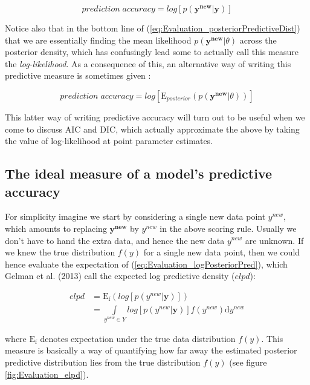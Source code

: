 \documentclass[11pt,fullpage]{book}
\begin{document}
\begin{equation}\label{eq:Evaluation_logPosteriorPred}
prediction\; accuracy = log\left[p(\boldsymbol{y^{new}}|\boldsymbol{y})\right]
\end{equation}

Notice also that in the bottom line of (\ref{eq:Evaluation_posteriorPredictiveDist}) that we are essentially finding the mean likelihood $p(\boldsymbol{y^{new}}|\theta)$ across the posterior density, which has confusingly lead some to actually call this measure the \textit{log-likelihood}. As a consequence of this, an alternative way of writing this predictive measure is sometimes given \cite{gelman2013bayesian}:

\begin{equation}\label{eq:Evaluation_logLikelihood}
prediction\; accuracy = log\left[\mathrm{E}_{posterior}(p(\boldsymbol{y^{new}}|\theta))\right]
\end{equation}

This latter way of writing predictive accuracy will turn out to be useful when we come to discuss AIC and DIC, which actually approximate the above by taking the value of log-likelihood at point parameter estimates.

\subsection{The ideal measure of a model's predictive accuracy}\label{sec:Evaluation_idealAccuracy}
For simplicity imagine we start by considering a single new data point $y^{new}$, which amounts to replacing $\boldsymbol{y^{new}}$ by $y^{new}$ in the above scoring rule. Usually we don't have to hand the extra data, and hence the new data $y^{new}$ are unknown. If we knew the true distribution $f(y)$ for a single new data point, then we could hence evaluate the expectation of (\ref{eq:Evaluation_logPosteriorPred}), which Gelman et al. (2013) call the expected log predictive density ($elpd$):

\begin{align}\label{eq:Evaluation_elpd}
elpd &= \mathrm{E_f}\left(log\left[p(y^{new}|\boldsymbol{y})\right]\right)\\
&= \int\limits_{y^{new}\in Y} log\left[p(y^{new}|\boldsymbol{y})\right] f(y^{new})\mathrm{d}y^{new}
\end{align}

where $\mathrm{E_f}$ denotes expectation under the true data distribution $f(y)$. This measure is basically a way of quantifying how far away the estimated posterior predictive distribution lies from the true distribution $f(y)$ (see figure \ref{fig:Evaluation_elpd}).
\end{document}
